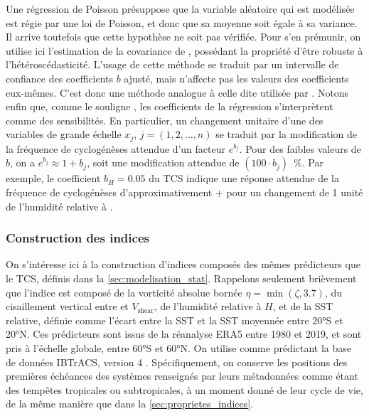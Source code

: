 \documentclass[../main.tex]{subfiles}
\begin{document}
Une régression de Poisson présuppose que la variable aléatoire qui est modélisée est régie par une loi de Poisson, et donc que sa moyenne soit égale à sa
variance. Il arrive toutefois que cette hypothèse ne soit pas vérifiée. Pour s'en prémunir, on utilise ici l'estimation de la covariance de
\textcite{mackinnon_heteroskedasticityconsistent_1985}, possédant la propriété d'être robuste à l'hétéroscédasticité. L'usage de cette méthode se traduit par un
intervalle de confiance des coefficients $b$ ajusté, mais n'affecte pas les valeurs des coefficients eux-mêmes. C'est donc une méthode analogue à celle dite
 utilisée par \textcite{tippett_poisson_2011}. Notons enfin que, comme le souligne \textcite{tippett_poisson_2011}, les coefficients de
la régression s'interprètent comme des sensibilités. En particulier, un changement unitaire d'une des variables de grande échelle $x_j$, $j = (1, 2, \ldots, n)$
se traduit par la modification de la fréquence de cyclogénèses attendue d'un facteur $e^{b_j}$. Pour des faibles valeurs de $b$, on a $e^{b_j} \approx 1 + b_j$,
soit une modification attendue de $(100 \cdot b_j)$~\%. Par exemple, le coefficient $b_H = \num{0.05}$ du TCS indique une réponse attendue de la fréquence de
cyclogénèses d'approximativement $+$ pour un changement de 1 unité de l'humidité relative à .

\subsubsection*{Construction des indices}\label{sec:construction_indices}

On s'intéresse ici à la construction d'indices composés des mêmes prédicteurs que le TCS, définis dans la \cref{sec:modelisation_stat}. Rappelons seulement
brièvement que l'indice est composé de la vorticité absolue bornée $\eta = \min(\zeta, \num{3.7})$, du cisaillement vertical entre  et 
$V_{\mathrm{shear}}$, de l'humidité relative à  $H$, et de la SST relative, définie comme l'écart entre la SST et la SST moyennée entre \ang{20}S et
\ang{20}N. Ces prédicteurs sont issus de la réanalyse ERA5 entre \num{1980} et \num{2019}, et sont pris à l'échelle globale, entre \ang{60}S et \ang{60}N. On
utilise comme prédictant la base de données IBTrACS, version 4 \parencite{knapp_international_2010}. Spécifiquement, on conserve les positions des premières
échéances des systèmes renseignés par leurs métadonnées comme étant des tempêtes tropicales ou subtropicales, à un moment donné de leur cycle de vie, de la même
manière que dans la \cref{sec:proprietes_indices}.
\end{document}
